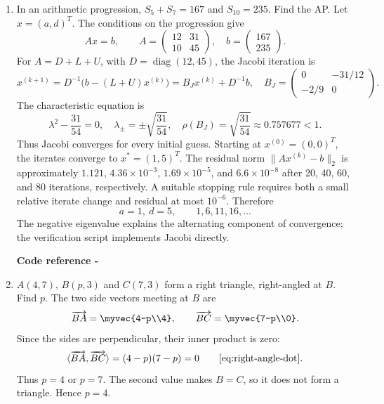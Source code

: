 \begin{enumerate}[label=\theenumi,leftmargin=4mm,itemsep=9pt]
The incircle diagram is generated by this script:
\par\smallskip
\noindent\textbf{Code reference -}
\par\noindent{}
\par\smallskip
\newpage
\setcounter{enumi}{7}\item In an arithmetic progression, $S_5+S_7=167$ and $S_{10}=235$. Find the AP.
\solution Let \(x=(a,d)^T\). The conditions on the progression give
\[
Ax=b,\qquad A=\begin{pmatrix}12&31\\10&45\end{pmatrix},
\quad b=\begin{pmatrix}167\\235\end{pmatrix}.
\]
For \(A=D+L+U\), with \(D=\operatorname{diag}(12,45)\), the
Jacobi iteration is
\[
x^{(k+1)}=D^{-1}\bigl(b-(L+U)x^{(k)}\bigr)
=B_Jx^{(k)}+D^{-1}b,
\quad B_J=\begin{pmatrix}0&-31/12\\-2/9&0\end{pmatrix}.
\]
The characteristic equation is
\[
\lambda^2-\frac{31}{54}=0,\quad
\lambda_\pm=\pm\sqrt{\frac{31}{54}},\quad
\rho(B_J)=\sqrt{\frac{31}{54}}\approx0.757677<1.
\]
Thus Jacobi converges for every initial guess. Starting at
\(x^{(0)}=(0,0)^T\), the iterates converge to \(x^*=(1,5)^T\).
The residual norm \(\|Ax^{(k)}-b\|_2\) is approximately
\(1.121\), \(4.36\times10^{-3}\), \(1.69\times10^{-5}\), and
\(6.6\times10^{-8}\) after 20, 40, 60, and 80 iterations,
respectively. A suitable stopping rule requires both a small relative
iterate change and residual at most \(10^{-6}\). Therefore
\[
\boxed{a=1,\ d=5},\qquad 1,6,11,16,\ldots
\]
The negative eigenvalue explains the alternating component of
convergence; the verification script implements Jacobi directly.
\par\smallskip
\noindent\textbf{Code reference -}
\par\noindent{}

\setcounter{enumi}{8}\item $A(4,7)$, $B(p,3)$ and $C(7,3)$ form a right triangle, right-angled at $B$. Find $p$.
\solution The two side vectors meeting at $B$ are
\begin{equation*}
\overrightarrow{BA}=\myvec{4-p\\4},\qquad \overrightarrow{BC}=\myvec{7-p\\0}.
\end{equation*}
Since the sides are perpendicular, their inner product is zero:
\begin{equation*}
\langle\overrightarrow{BA},\overrightarrow{BC}\rangle=(4-p)(7-p)=0\qquad\eqref{eq:right-angle-dot}.
\end{equation*}
Thus $p=4$ or $p=7$. The second value makes $B=C$, so it does not form a triangle. Hence $p=4$.





\end{enumerate}
